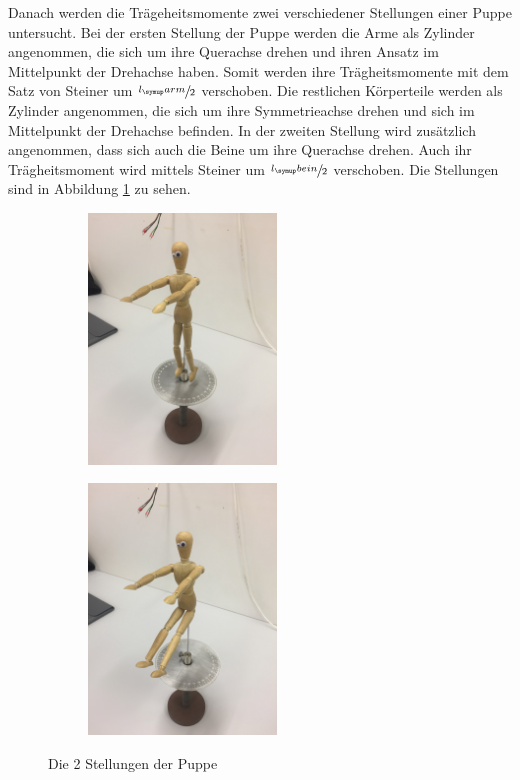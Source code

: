 \noindent Danach werden die Trägeheitsmomente zwei verschiedener Stellungen einer Puppe
untersucht.
Bei der ersten Stellung der Puppe werden die Arme als Zylinder angenommen, die sich um
ihre Querachse drehen und ihren Ansatz im Mittelpunkt der Drehachse haben. Somit werden
ihre Trägheitsmomente mit dem Satz von Steiner um $\sfrac{l_\su{arm}}{2}$ verschoben.
Die restlichen Körperteile werden als Zylinder angenommen, die sich um ihre Symmetrieachse
drehen und sich im Mittelpunkt der Drehachse befinden.
In der zweiten Stellung wird zusätzlich angenommen, dass sich auch die Beine um ihre
Querachse drehen. Auch ihr Trägheitsmoment wird mittels Steiner um $\sfrac{l_\su{bein}}{2}$
verschoben. Die Stellungen sind in Abbildung \ref{fig:stellung} zu sehen.
\begin{figure}
  \centering
  \begin{subfigure}{0.48\textwidth}
    \centering
    \includegraphics[width=5cm,angle=-90]{bilder/stellung1.JPG}
  \end{subfigure}
  \begin{subfigure}{0.48\textwidth}
    \centering
    \includegraphics[width=5cm, angle=-90]{bilder/stellung2.JPG}
  \end{subfigure}
  \caption{Die 2 Stellungen der Puppe}
  \label{fig:stellung}
\end{figure}
